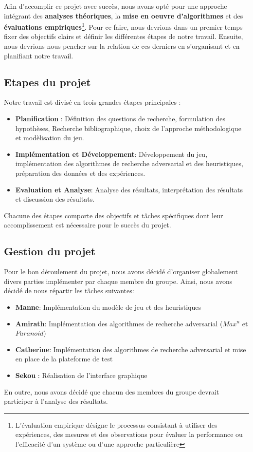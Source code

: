 Afin d'accomplir ce projet avec succès, nous avons opté pour une approche intégrant des
\textbf{analyses théoriques}, la \textbf{mise en oeuvre d'algorithmes} et des \textbf{évaluations
empiriques}\footnote{L'évaluation empirique désigne le processus consistant à utiliser des 
expériences, des mesures et des observations pour évaluer la performance ou l'efficacité 
d'un système ou d'une approche particulière}. Pour ce faire, nous devrions dans un premier temps
fixer des objectifs clairs et définir les différentes étapes de notre travail. Ensuite, nous devrions
nous pencher sur la relation de ces derniers en s'organisant et en planifiant notre travail.

\subsection{Etapes du projet}
Notre travail est divisé en trois grandes étapes principales :
\begin{itemize}
	\item \textbf{Planification} :  Définition des questions de recherche, formulation des hypothèses, Recherche bibliographique, choix de l'approche méthodologique et modèlisation du jeu.
	\item \textbf{Implémentation et Développement}: Développement du jeu, implémentation des algorithmes de recherche adversarial et des heuristiques, préparation des données et des expériences.
	\item \textbf{Evaluation et Analyse}: Analyse des résultats, interprétation des résultats et discussion des résultats.
\end{itemize}
Chacune des étapes comporte des objectifs et tâches spécifiques dont leur accomplissement est 
nécessaire pour le succès du projet.

\subsection{Gestion du projet}

Pour le bon déroulement du projet, nous avons décidé d'organiser globalement divers parties implémenter par chaque membre du groupe. 
Ainsi, nous avons décidé de nous répartir les tâches suivantes:
\begin{itemize}
	\item \textbf{Manne}: Implémentation du modèle de jeu et des heuristiques
	\item \textbf{Amirath}: Implémentation des algorithmes de recherche adversarial ($Max^n$ et $Paranoid$)
	\item \textbf{Catherine}: Implémentation des algorithmes de recherche adversarial et mise en place de la plateforme de test
	\item \textbf{Sekou} : Réalisation de l'interface graphique
\end{itemize}
En outre, nous avons décidé que chacun des membres du groupe devrait participer à l'analyse des résultats.

